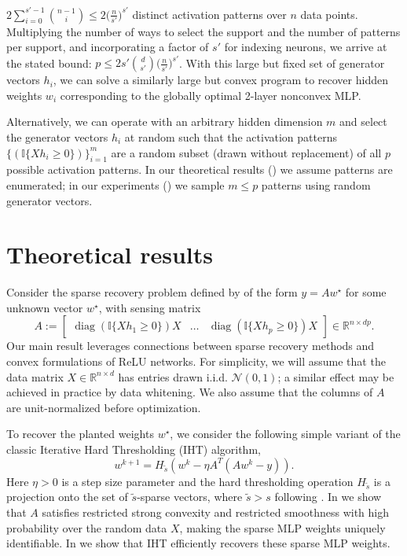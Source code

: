 \documentclass{article} %
\newcommand{\measurement}{y}
\newcommand{\n}{\ensuremath{n}}
\newcommand{\m}{\ensuremath{m}}
\newcommand{\p}{\ensuremath{p}}
\newcommand{\datadim}{\ensuremath{d}}
\newcommand{\X}{\ensuremath{X}}
\newcommand{\w}{\ensuremath{w}}
\newcommand{\h}{\ensuremath{h}}
\DeclareMathOperator{\diag}{diag}
\newcommand{\1}{\ensuremath{{\sf (i)}}}
\newcommand{\2}{\ensuremath{{\sf (ii)}}}
\newcommand{\3}{\ensuremath{{\sf (iii)}}}
\newcommand{\4}{\ensuremath{{\sf (iv)}}}
\newcommand{\5}{\ensuremath{{\sf (v)}}}
\newcommand{\6}{\ensuremath{{\sf (vi)}}}
\newcommand{\R}{\mathbb{R}}
\begin{document}
 $2\sum_{i=0}^{s'-1} {\n-1 \choose i} \leq 2 \big(\frac{n}{s'}\big)^{s'}$
 distinct activation patterns over $\n$
 data points. Multiplying the number of ways to select the support and the number of patterns per support, and incorporating a factor of $s'$
 for indexing neurons, we arrive at the stated bound: $p\le 2s'{\datadim \choose s'}{\big(\frac{n}{s'}}\big)^{s'}$.
With this large but fixed set of generator vectors $\h_i$, we can solve a similarly large but convex program to recover hidden weights $\w_i$ corresponding to the globally optimal 2-layer nonconvex MLP. 

Alternatively, we can operate with an arbitrary hidden dimension $\m$ and select the generator vectors $\h_i$ at random such that the activation patterns $\{(\mathbb{I}\{\X\h_i\geq 0\})\}_{i=1}^\m$ are a random subset (drawn without replacement) of all $\p$ possible activation patterns.
In our theoretical results () we assume patterns are enumerated; in our experiments () we sample $\m \leq \p$ patterns using random generator vectors.


\section{Theoretical results}
\label{sec:theory}


Consider the sparse recovery problem defined by  of the form $y=Aw^\star$ for some unknown vector $w^\star$, with sensing matrix 
$$
A := \begin{bmatrix}
    \diag{(\mathbb{I}\{\X\h_1 \geq 0\})}\X & \dots & \diag{(\mathbb{I}\{\X\h_\p \geq 0\})}\X \end{bmatrix} \in \R^{\n \times \datadim \p}.
$$
Our main result leverages connections between sparse recovery methods and convex formulations of ReLU networks.
For simplicity, we will assume that the data matrix $\X \in \R^{\n \times \datadim}$ has entries drawn i.i.d. $\mathcal{N}(0,1)$; a similar effect may be achieved in practice by data whitening. We also assume that the columns of $A$ are unit-normalized before optimization.


To recover the planted weights $\w^\star$, we consider the 
following simple variant of the 
classic Iterative Hard Thresholding (IHT) algorithm,
\begin{equation} \label{eq:iht}
    \w^{k+1} = H_{\tilde s}(\w^k - \eta A^T(A\w^k - \measurement)).
\end{equation}
Here $\eta > 0$ is a step size parameter and the hard thresholding operation
$H_{\tilde s}$
is a projection onto 
the set of $\tilde s$-sparse vectors, where $\tilde s > s$ following \citet{jain2014iterative}. 
In  we show that $A$ satisfies restricted strong convexity and restricted smoothness with high probability over the random data $\X$, making the sparse MLP weights uniquely identifiable. In  we show that IHT efficiently recovers these sparse MLP weights.
\end{document}
